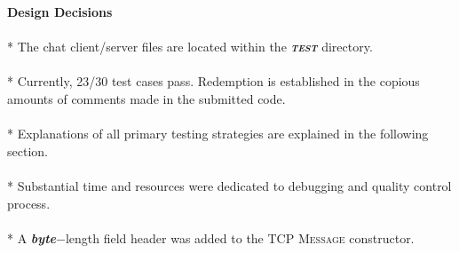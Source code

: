 \documentclass[12pt]{article}
\begin{document}
{\setlength{\parindent}{0cm}
\textbf{Design Decisions} \\
\paragraph{} * The chat client/server files are located within the \textsc{\textbf{\textit{test}}} directory.
\paragraph{} * Currently, 23/30 test cases pass. Redemption is established in the copious amounts of comments made in the submitted code.
\paragraph{} * Explanations of all primary testing strategies are explained in the following section.
\paragraph{} * Substantial time and resources were dedicated to debugging and quality control process.
\paragraph{} * A \textbf{\textit{byte}}$-$length field header was added to the TCP \textsc{Message} constructor.
\\\\
}
\end{document}
